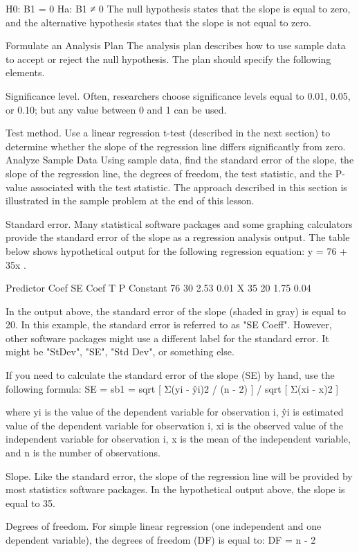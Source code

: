 \documentclass[a4paper,12pt]{article}
\begin{document}
H0: Β1 = 0 
Ha: Β1 ≠ 0
The null hypothesis states that the slope is equal to zero, and the alternative hypothesis states that the slope is not equal to zero.

Formulate an Analysis Plan
The analysis plan describes how to use sample data to accept or reject the null hypothesis. The plan should specify the following elements.

Significance level. Often, researchers choose significance levels equal to 0.01, 0.05, or 0.10; but any value between 0 and 1 can be used.

Test method. Use a linear regression t-test (described in the next section) to determine whether the slope of the regression line differs significantly from zero.
Analyze Sample Data
Using sample data, find the standard error of the slope, the slope of the regression line, the degrees of freedom, the test statistic, and the P-value associated with the test statistic. The approach described in this section is illustrated in the sample problem at the end of this lesson.

Standard error. Many statistical software packages and some graphing calculators provide the standard error of the slope as a regression analysis output. The table below shows hypothetical output for the following regression equation: y = 76 + 35x .

Predictor	Coef	SE Coef	T	P
Constant	76	30	2.53	0.01
X	35	20	1.75	0.04

In the output above, the standard error of the slope (shaded in gray) is equal to 20. In this example, the standard error is referred to as "SE Coeff". However, other software packages might use a different label for the standard error. It might be "StDev", "SE", "Std Dev", or something else. 

If you need to calculate the standard error of the slope (SE) by hand, use the following formula:
SE = sb1 = sqrt [ Σ(yi - ŷi)2 / (n - 2) ] / sqrt [ Σ(xi - x)2 ]

where yi is the value of the dependent variable for observation i, ŷi is estimated value of the dependent variable for observation i, xi is the observed value of the independent variable for observation i, x is the mean of the independent variable, and n is the number of observations.

Slope. Like the standard error, the slope of the regression line will be provided by most statistics software packages. In the hypothetical output above, the slope is equal to 35.

Degrees of freedom. For simple linear regression (one independent and one dependent variable), the degrees of freedom (DF) is equal to:
DF = n - 2
\end{document}
